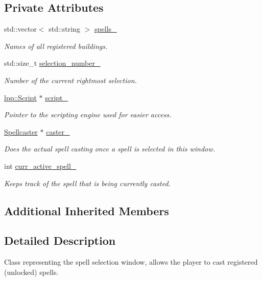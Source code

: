 \subsection*{Private Attributes}
\begin{DoxyCompactItemize}
\item 
std\+::vector$<$ std\+::string $>$ \hyperlink{class_spell_casting_window_ae155ce0f3e4dd38c6eeadede5d841d62}{spells\+\_\+}
\begin{DoxyCompactList}\small\item\em Names of all registered buildings. \end{DoxyCompactList}\item 
std\+::size\+\_\+t \hyperlink{class_spell_casting_window_a4ddb71ef5c7ca69e952bf49fbb0d41a7}{selection\+\_\+number\+\_\+}
\begin{DoxyCompactList}\small\item\em Number of the current rightmost selection. \end{DoxyCompactList}\item 
\hyperlink{classlpp_1_1_script}{lpp\+::\+Script} $\ast$ \hyperlink{class_spell_casting_window_ab31a088d48bc14324959e242ea2ff2d2}{script\+\_\+}
\begin{DoxyCompactList}\small\item\em Pointer to the scripting engine used for easier access. \end{DoxyCompactList}\item 
\hyperlink{class_spellcaster}{Spellcaster} $\ast$ \hyperlink{class_spell_casting_window_a4115e976e15588fce9cb953df23e69e5}{caster\+\_\+}
\begin{DoxyCompactList}\small\item\em Does the actual spell casting once a spell is selected in this window. \end{DoxyCompactList}\item 
int \hyperlink{class_spell_casting_window_adf1f5455827f746f5adbfb06cefc6c66}{curr\+\_\+active\+\_\+spell\+\_\+}
\begin{DoxyCompactList}\small\item\em Keeps track of the spell that is being currently casted. \end{DoxyCompactList}\end{DoxyCompactItemize}
\subsection*{Additional Inherited Members}


\subsection{Detailed Description}
Class representing the spell selection window, allows the player to cast registered (unlocked) spells. 

